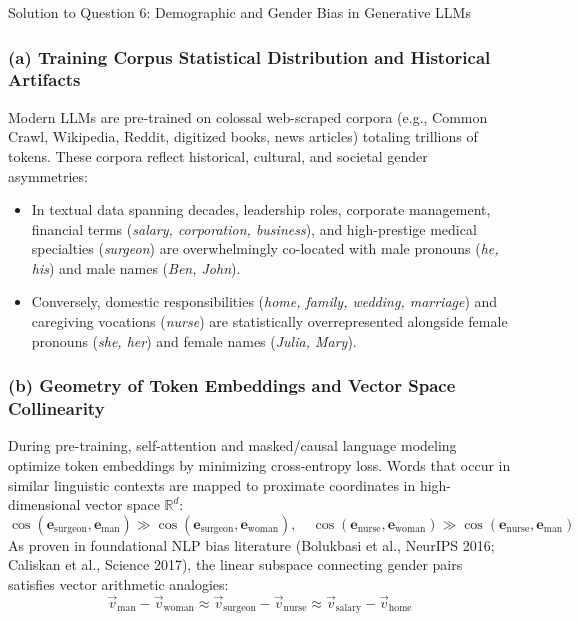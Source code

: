 \documentclass[11pt,a4paper]{article}
\begin{document}
\begin{solutionbox}{Solution to Question 6: Demographic and Gender Bias in Generative LLMs}
\subsubsection*{(a) Training Corpus Statistical Distribution and Historical Artifacts}
Modern LLMs are pre-trained on colossal web-scraped corpora (e.g., Common Crawl, Wikipedia, Reddit, digitized books, news articles) totaling trillions of tokens. These corpora reflect historical, cultural, and societal gender asymmetries:
\begin{itemize}[leftmargin=1.5em,itemsep=1pt]
    \item In textual data spanning decades, leadership roles, corporate management, financial terms (\textit{salary, corporation, business}), and high-prestige medical specialties (\textit{surgeon}) are overwhelmingly co-located with male pronouns (\textit{he, his}) and male names (\textit{Ben, John}).
    \item Conversely, domestic responsibilities (\textit{home, family, wedding, marriage}) and caregiving vocations (\textit{nurse}) are statistically overrepresented alongside female pronouns (\textit{she, her}) and female names (\textit{Julia, Mary}).
\end{itemize}

\subsubsection*{(b) Geometry of Token Embeddings and Vector Space Collinearity}
During pre-training, self-attention and masked/causal language modeling optimize token embeddings by minimizing cross-entropy loss. Words that occur in similar linguistic contexts are mapped to proximate coordinates in high-dimensional vector space $\mathbb{R}^d$:
\begin{equation}
    \cos(\mathbf{e}_{\text{surgeon}}, \mathbf{e}_{\text{man}}) \gg \cos(\mathbf{e}_{\text{surgeon}}, \mathbf{e}_{\text{woman}}), \quad
    \cos(\mathbf{e}_{\text{nurse}}, \mathbf{e}_{\text{woman}}) \gg \cos(\mathbf{e}_{\text{nurse}}, \mathbf{e}_{\text{man}})
\end{equation}
As proven in foundational NLP bias literature (Bolukbasi et al., NeurIPS 2016; Caliskan et al., Science 2017), the linear subspace connecting gender pairs satisfies vector arithmetic analogies:
\begin{equation}
    \vec{v}_{\text{man}} - \vec{v}_{\text{woman}} \approx \vec{v}_{\text{surgeon}} - \vec{v}_{\text{nurse}} \approx \vec{v}_{\text{salary}} - \vec{v}_{\text{home}}
\end{equation}


\end{solutionbox}
\end{document}
